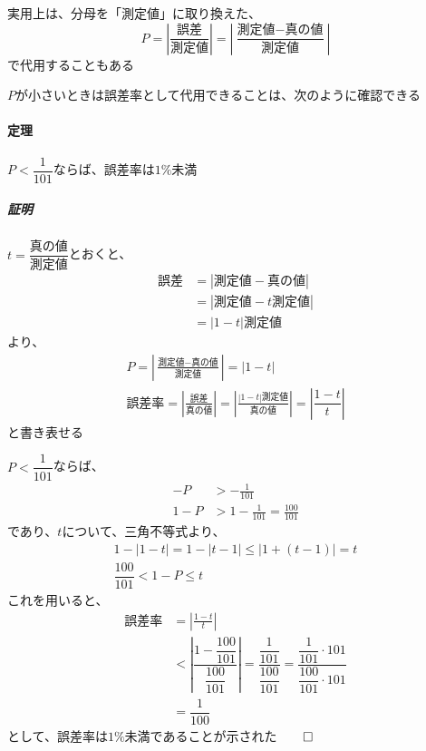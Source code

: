 \documentclass[../book_jiriki_calc]{subfiles}
\begin{document}
実用上は、分母を「測定値」に取り換えた、
\begin{equation*}
  P = \left|\frac{\text{誤差}}{\text{測定値}}\right| = \left|\frac{\text{測定値} - \text{真の値}}{\text{測定値}}\right|
\end{equation*}
で代用することもある

\br

$P$が小さいときは誤差率として代用できることは、次のように確認できる

\sectionline

\paragraph{定理}

$P<\dfrac{1}{101}$ならば、誤差率は$1\%$未満

\sectionline

\subparagraph{証明}

$t=\dfrac{\text{真の値}}{\text{測定値}}$とおくと、
\begin{align*}
  \text{誤差} & = \left|\text{測定値} - \text{真の値}\right|  \\
            & = \left|\text{測定値} - t\text{測定値}\right| \\
            & = \left|1-t\right|\text{測定値}
\end{align*}
より、
\begin{gather}
  P          = \left|\frac{\text{測定値} - \text{真の値}}{\text{測定値}}\right| = \left|1-t\right| \\
  \text{誤差率} = \left|\frac{\text{誤差}}{\text{真の値}}\right| = \left|\frac{\left|1-t\right|\text{測定値}}{\text{真の値}}\right| =\left|\dfrac{1-t}{t}\right|
\end{gather}
と書き表せる

\br

$P<\dfrac{1}{101}$ならば、
\begin{align*}
  -P  & > -\frac{1}{101}                    \\
  1-P & > 1-\frac{1}{101} = \frac{100}{101}
\end{align*}
であり、$t$について、三角不等式より、
\begin{gather}
  1 - \left| 1-t\right| = 1 - \left| t-1\right| \leq \left| 1+ (t-1)\right| = t \\
  \dfrac{100}{101} < 1-P \leq t
\end{gather}
これを用いると、
\begin{align*}
  \text{誤差率} & = \left|\frac{1-t}{t}\right|                                                                                                                                        \\
             & < \left|\dfrac{1-\dfrac{100}{101}}{\dfrac{100}{101}}\right| = \dfrac{\dfrac{1}{101}}{\dfrac{100}{101}} = \dfrac{\dfrac{1}{101}\cdot 101}{\dfrac{100}{101}\cdot 101} \\
             & = \dfrac{1}{100}
\end{align*}
として、誤差率は$1\%$未満であることが示された$\qed$
\end{document}
